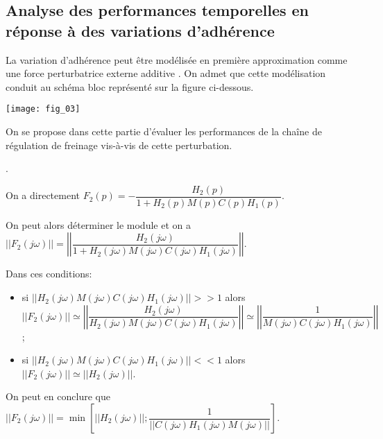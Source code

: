 \subsection*{Analyse des performances temporelles en réponse à des variations d’adhérence}
\ifprof
\else
La variation d’adhérence peut être modélisée en première approximation comme une force perturbatrice externe additive . On admet que cette modélisation conduit au schéma bloc représenté sur la figure ci-dessous.

\begin{marginfigure}
\texttt{[image: fig\_03]}
\end{marginfigure}

On se propose dans cette partie d’évaluer les performances de la chaîne de régulation de freinage vis-à-vis de cette perturbation.

\fi

.

\ifprof
\begin{corrige}
On a directement $F_2(p)=-\dfrac{H_2(p)}{1+H_2(p)M(p)C(p)H_1(p)}$.

On peut alors déterminer le module et on a $||F_2(j\omega)||=\left|\left|\dfrac{H_2(j\omega)}{1+H_2(j\omega)M(j\omega)C(j\omega)H_1(j\omega)}\right|\right|$. 

Dans ces conditions: 
\begin{itemize} 
\item si $\left|\left|{H_2(j\omega)M(j\omega)C(j\omega)H_1(j\omega)}\right|\right|>>1$ alors  $||F_2(j\omega)||\simeq \left|\left|\dfrac{H_2(j\omega)}{H_2(j\omega)M(j\omega)C(j\omega)H_1(j\omega)}\right|\right|\simeq \left|\left|\dfrac{1}{M(j\omega)C(j\omega)H_1(j\omega)}\right|\right|$;
\item si $\left|\left|{H_2(j\omega)M(j\omega)C(j\omega)H_1(j\omega)}\right|\right|<<1$ alors  $||F_2(j\omega)||\simeq \left|\left|{H_2(j\omega)}\right|\right|$.
\end{itemize}

On peut en conclure que $||F_2(j \omega)|| = \min \left[ ||H_2(j \omega) || ; \dfrac{1}{||C(j\omega) H_1(j \omega) M(j\omega)||}\right]$.
\end{corrige}
\else
\fi


